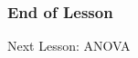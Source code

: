 \documentclass[xcolor=dvipsnames]{beamer}
\begin{document}

\begin{frame}
  \frametitle{End of Lesson}
Next Lesson: ANOVA
\end{frame}
\end{document}
